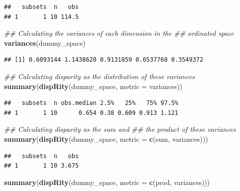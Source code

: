 \documentclass[
]{book}
\newenvironment{Shaded}{\begin{snugshade}}{\end{snugshade}}
\newcommand{\CommentTok}[1]{\textcolor[rgb]{0.56,0.35,0.01}{\textit{#1}}}
\newcommand{\DataTypeTok}[1]{\textcolor[rgb]{0.13,0.29,0.53}{#1}}
\newcommand{\KeywordTok}[1]{\textcolor[rgb]{0.13,0.29,0.53}{\textbf{#1}}}
\newcommand{\NormalTok}[1]{#1}
\begin{document}
\begin{verbatim}
##   subsets  n   obs
## 1       1 10 114.5
\end{verbatim}

\begin{Shaded}
\begin{Highlighting}[]
\CommentTok{\#\# Calculating the variances of each dimension in the}
\CommentTok{\#\# ordinated space}
\KeywordTok{variances}\NormalTok{(dummy\_space)}
\end{Highlighting}
\end{Shaded}

\begin{verbatim}
## [1] 0.6093144 1.1438620 0.9131859 0.6537768 0.3549372
\end{verbatim}

\begin{Shaded}
\begin{Highlighting}[]
\CommentTok{\#\# Calculating disparity as the distribution of these variances}
\KeywordTok{summary}\NormalTok{(}\KeywordTok{dispRity}\NormalTok{(dummy\_space, }\DataTypeTok{metric =}\NormalTok{ variances))}
\end{Highlighting}
\end{Shaded}

\begin{verbatim}
##   subsets  n obs.median 2.5%   25%   75% 97.5%
## 1       1 10      0.654 0.38 0.609 0.913 1.121
\end{verbatim}

\begin{Shaded}
\begin{Highlighting}[]
\CommentTok{\#\# Calculating disparity as the sum and}
\CommentTok{\#\# the product of these variances}
\KeywordTok{summary}\NormalTok{(}\KeywordTok{dispRity}\NormalTok{(dummy\_space, }\DataTypeTok{metric =} \KeywordTok{c}\NormalTok{(sum, variances)))}
\end{Highlighting}
\end{Shaded}

\begin{verbatim}
##   subsets  n   obs
## 1       1 10 3.675
\end{verbatim}

\begin{Shaded}
\begin{Highlighting}[]
\KeywordTok{summary}\NormalTok{(}\KeywordTok{dispRity}\NormalTok{(dummy\_space, }\DataTypeTok{metric =} \KeywordTok{c}\NormalTok{(prod, variances)))}
\end{Highlighting}
\end{Shaded}
\end{document}
